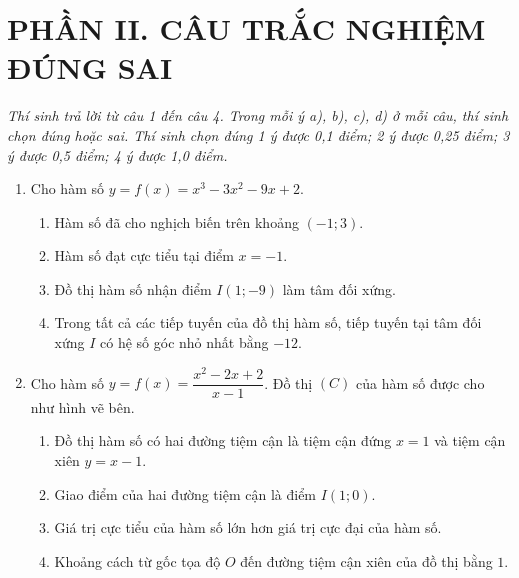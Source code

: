 \documentclass[12pt,a4paper]{article}
\begin{document}
\section*{\large PHẦN II. CÂU TRẮC NGHIỆM ĐÚNG SAI}
\textit{Thí sinh trả lời từ câu 1 đến câu 4. Trong mỗi ý a), b), c), d) ở mỗi câu, thí sinh chọn đúng hoặc sai. Thí sinh chọn đúng 1 ý được 0,1 điểm; 2 ý được 0,25 điểm; 3 ý được 0,5 điểm; 4 ý được 1,0 điểm.}
\begin{enumerate}
\item Cho hàm số $y = f(x) = x^3 - 3x^2 - 9x + 2$.
\begin{enumerate}[label=\alph*)]
\item Hàm số đã cho nghịch biến trên khoảng $(-1; 3)$.
\item Hàm số đạt cực tiểu tại điểm $x = -1$.
\item Đồ thị hàm số nhận điểm $I(1; -9)$ làm tâm đối xứng.
\item Trong tất cả các tiếp tuyến của đồ thị hàm số, tiếp tuyến tại tâm đối xứng $I$ có hệ số góc nhỏ nhất bằng $-12$.
\end{enumerate}

\item \begin{minipage}[t]{0.56\linewidth}
Cho hàm số $y = f(x) = \dfrac{x^2 - 2x + 2}{x - 1}$. Đồ thị $(C)$ của hàm số được cho như hình vẽ bên.
\begin{enumerate}[label=\alph*)]
\item Đồ thị hàm số có hai đường tiệm cận là tiệm cận đứng $x = 1$ và tiệm cận xiên $y = x - 1$.
\item Giao điểm của hai đường tiệm cận là điểm $I(1; 0)$.
\item Giá trị cực tiểu của hàm số lớn hơn giá trị cực đại của hàm số.
\item Khoảng cách từ gốc tọa độ $O$ đến đường tiệm cận xiên của đồ thị bằng $1$.
\end{enumerate}
\end{minipage}\hfill
\begin{minipage}[t]{0.41\linewidth}\vspace{-0.4\baselineskip}\centering
{}
\end{minipage}


\end{enumerate}
\end{document}

